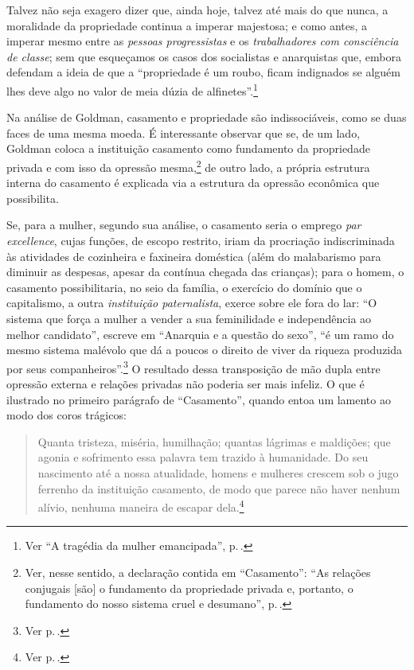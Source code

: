 Talvez não seja exagero
dizer que, ainda hoje, talvez até mais do que nunca, a moralidade da
propriedade continua a imperar majestosa; e como antes, a imperar mesmo
entre as \textit{pessoas progressistas} e os \textit{trabalhadores com consciência
de classe}; sem que esqueçamos os casos dos socialistas e anarquistas
que, embora defendam a ideia de que a ``propriedade é um roubo, ficam indignados se
alguém lhes deve algo no valor de meia dúzia de alfinetes''.\footnote{Ver ``A tragédia da mulher emancipada'', p.\,\pageref{alfinete}.}

Na análise de Goldman, casamento e propriedade são indissociáveis, como
se duas faces de uma mesma moeda. É interessante observar que se,
de um lado, Goldman coloca a instituição casamento como
fundamento da propriedade privada e com isso da opressão mesma,\footnote{Ver,
nesse sentido, a declaração contida em ``Casamento'': ``As relações
conjugais {[}são{]} o fundamento da propriedade privada e, portanto, o
fundamento do nosso sistema cruel e desumano'', p.\,\pageref{cruel}.} de outro lado,
a própria estrutura interna do casamento é explicada via a estrutura da
opressão econômica que possibilita.

Se, para a mulher, segundo sua
análise, o casamento seria o emprego \textit{par excellence}, cujas
funções, de escopo restrito, iriam da procriação indiscriminada
às atividades de cozinheira e faxineira doméstica (além do
malabarismo para diminuir as despesas, apesar da contínua chegada das
crianças); para o homem, o casamento possibilitaria, no seio da família,
o exercício do domínio que o capitalismo, a outra \textit{instituição
paternalista}, exerce sobre ele fora do lar: ``O sistema que
força a mulher a vender a sua feminilidade e independência ao melhor
candidato'', escreve em ``Anarquia e a questão do sexo'', ``é um ramo do
mesmo sistema malévolo que dá a poucos o direito de viver da riqueza
produzida por seus companheiros''.\footnote{Ver p.\,\pageref{sistema}.} O resultado dessa transposição de mão
dupla entre opressão externa e relações privadas não poderia ser mais
infeliz. O que é ilustrado no primeiro parágrafo de ``Casamento'',
quando entoa um lamento ao modo dos coros trágicos:

\begin{quote}
Quanta tristeza, miséria, humilhação; quantas lágrimas e maldições; que
agonia e sofrimento essa palavra tem trazido à humanidade. Do seu
nascimento até a nossa atualidade, homens e mulheres crescem sob o jugo
ferrenho da instituição casamento, de modo que parece não haver nenhum
alívio, nenhuma maneira de escapar dela.\footnote{Ver p.\,\pageref{casamento}.}
\end{quote}

